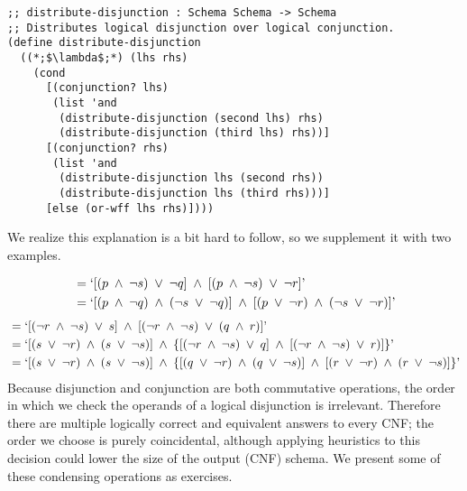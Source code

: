 \begin{cl}[]{}
\begin{lstlisting}[language=MyScheme]
;; distribute-disjunction : Schema Schema -> Schema
;; Distributes logical disjunction over logical conjunction.
(define distribute-disjunction
  ((*;$\lambda$;*) (lhs rhs)
    (cond
      [(conjunction? lhs)
       (list 'and
        (distribute-disjunction (second lhs) rhs)
        (distribute-disjunction (third lhs) rhs))]
      [(conjunction? rhs)
       (list 'and
        (distribute-disjunction lhs (second rhs))
        (distribute-disjunction lhs (third rhs)))]
      [else (or-wff lhs rhs)])))
\end{lstlisting}
\end{cl}

We realize this explanation is a bit hard to follow, so we supplement it with two examples.

\begin{align*}
    &= `[(p\;\land\;\lnot{s})\;\lor\;\lnot{q}]\;\land\;[(p\;\land\;\lnot{s})\;\lor\;\lnot{r}]\text{'}\\
    &= `[(p\;\land\;\lnot{q})\;\land\;(\lnot{s}\;\lor\;\lnot{q})]\;\land\;[(p\;\lor\;\lnot{r})\;\land\;(\lnot{s}\;\lor\;\lnot{r})]\text{'}\\
\end{align*}
\begin{align*}
    &= `[(\lnot{r}\;\land\;\lnot{s})\;\lor\;s]\;\land\;[(\lnot{r}\;\land\;\lnot{s})\;\lor\;(q\;\land\;r)]\text{'}\\
    &= `[(s\;\lor\;\lnot{r})\;\land\;(s\;\lor\;\lnot{s})]\;\land\;\{[(\lnot{r}\;\land\;\lnot{s})\;\lor\;q]\;\land\;[(\lnot{r}\;\land\;\lnot{s})\;\lor\;r)]\}\text{'}\\
    &= `[(s\;\lor\;\lnot{r})\;\land\;(s\;\lor\;\lnot{s})]\;\land\;\{[(q\;\lor\;\lnot{r})\;\land\;(q\;\lor\;\lnot{s})]\;\land\;[(r\;\lor\;\lnot{r})\;\land\;(r\;\lor\;\lnot{s})]\}\text{'}
\end{align*}
Because disjunction and conjunction are both commutative operations, the order in which we check the operands of a logical disjunction is irrelevant. Therefore there are multiple logically correct and equivalent answers to every CNF; the order we choose is purely coincidental, although applying heuristics to this decision could lower the size of the output (CNF) schema. We present some of these condensing operations as exercises.

